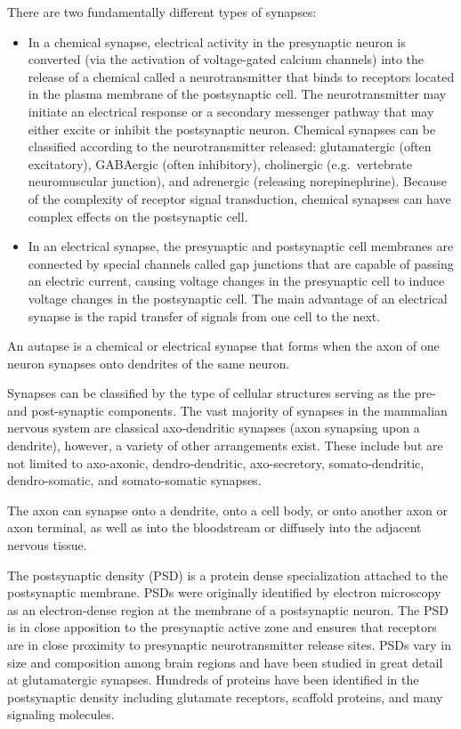 There are two fundamentally different types of synapses:

\begin{itemize}
\tightlist
\item
  In a chemical synapse, electrical activity in the presynaptic neuron is converted (via the activation of voltage-gated calcium channels) into the release of a chemical called a neurotransmitter that binds to receptors located in the plasma membrane of the postsynaptic cell. The neurotransmitter may initiate an electrical response or a secondary messenger pathway that may either excite or inhibit the postsynaptic neuron. Chemical synapses can be classified according to the neurotransmitter released: glutamatergic (often excitatory), GABAergic (often inhibitory), cholinergic (e.g.~vertebrate neuromuscular junction), and adrenergic (releasing norepinephrine). Because of the complexity of receptor signal transduction, chemical synapses can have complex effects on the postsynaptic cell.
\item
  In an electrical synapse, the presynaptic and postsynaptic cell membranes are connected by special channels called gap junctions that are capable of passing an electric current, causing voltage changes in the presynaptic cell to induce voltage changes in the postsynaptic cell. The main advantage of an electrical synapse is the rapid transfer of signals from one cell to the next.
\end{itemize}

An autapse is a chemical or electrical synapse that forms when the axon of one neuron synapses onto dendrites of the same neuron.

Synapses can be classified by the type of cellular structures serving as the pre- and post-synaptic components. The vast majority of synapses in the mammalian nervous system are classical axo-dendritic synapses (axon synapsing upon a dendrite), however, a variety of other arrangements exist. These include but are not limited to axo-axonic, dendro-dendritic, axo-secretory, somato-dendritic, dendro-somatic, and somato-somatic synapses.

The axon can synapse onto a dendrite, onto a cell body, or onto another axon or axon terminal, as well as into the bloodstream or diffusely into the adjacent nervous tissue.

The postsynaptic density (PSD) is a protein dense specialization attached to the postsynaptic membrane. PSDs were originally identified by electron microscopy as an electron-dense region at the membrane of a postsynaptic neuron. The PSD is in close apposition to the presynaptic active zone and ensures that receptors are in close proximity to presynaptic neurotransmitter release sites. PSDs vary in size and composition among brain regions and have been studied in great detail at glutamatergic synapses. Hundreds of proteins have been identified in the postsynaptic density including glutamate receptors, scaffold proteins, and many signaling molecules.

